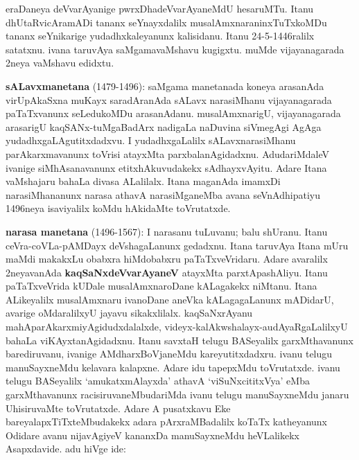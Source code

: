 \documentclass[11pt,a4size]{article}
\begin{document}
eraDaneya deVvarAyanige pwrxDhadeVvarAyaneMdU hesaruMTu. Itanu
dhUtaRvicAramADi tananx seYnayxdalilx musalAmxnaraninxTuTxkoMDu tananx
seYnikarige yudadhxkaleyanunx kalisidanu. Itanu 24-5-1446ralilx
satatxnu. ivana taruvAya saMgamavaMshavu kugigxtu. muMde
vijayanagarada 2neya vaMshavu edidxtu.

\textbf{sALavxmanetana} (1479-1496): saMgama manetanada koneya
arasanAda virUpAkaSxna muKayx saradAranAda sALavx narasiMhanu
vijayanagarada paTaTxvanunx seLedukoMDu arasanAdanu. musalAmxnarigU,
vijayanagarada arasarigU kaqSANx-tuMgaBadArx nadigaLa naDuvina
siVmegAgi AgAga yudadhxgaLAgutitxdadxvu. I yudadhxgaLalilx
sALavxnarasiMhanu parAkarxmavanunx toVrisi atayxMta
parxbalanAgidadxnu. AdudariMdaleV ivanige siMhAsanavanunx
etitxhAkuvudakekx sAdhayxvAyitu. Adare Itana vaMshajaru bahaLa divasa
ALalilalx. Itana maganAda imamxDi narasiMhananunx narasa athavA
narasiMganeMba avana seVnAdhipatiyu 1496neya isaviyalilx koMdu
hAkidaMte toVrutatxde.

\textbf{narasa manetana} (1496-1567): I narasanu tuLuvanu; balu
shUranu. Itanu ceVra-coVLa-pAMDayx deVshagaLanunx gedadxnu. Itana
taruvAya Itana mUru maMdi makakxLu obabxra hiMdobabxru
paTaTxveVridaru. Adare avaralilx 2neyavanAda
\textbf{kaqSaNxdeVvarAyaneV} atayxMta parxtApashAliyu. Itanu
paTaTxveVrida kUDale musalAmxnaroDane kALagakekx niMtanu. Itana
ALikeyalilx musalAmxnaru ivanoDane aneVka kALagagaLanunx mADidarU,
avarige oMdaralilxyU jayavu sikakxlilalx. kaqSaNxrAyanu 
mahAparAkarxmiyAgidudxdalalxde, videyx-kalAkwshalayx-audAyaRgaLalilxyU
bahaLa viKAyxtanAgidadxnu. Itanu savxtaH telugu BASeyalilx
garxMthavanunx barediruvanu, ivanige AMdharxBoVjaneMdu
kareyutitxdadxru. ivanu telugu manuSayxneMdu kelavara kalapxne. Adare
idu tapepxMdu toVrutatxde. ivanu telugu BASeyalilx `amukatxmAlayxda'
athavA `viSuNxcititxVya' eMba garxMthavanunx racisiruvaneMbudariMda
ivanu telugu manuSayxneMdu janaru UhisiruvaMte toVrutatxde. Adare A
pusatxkavu Eke bareyalapxTiTxteMbudakekx adara pArxraMBadalilx koTaTx
katheyanunx Odidare avanu nijavAgiyeV kananxDa manuSayxneMdu
heVLalikekx Asapxdavide. adu hiVge ide:
\end{document}
